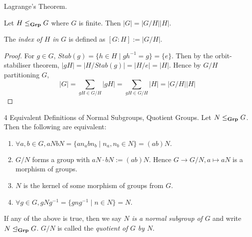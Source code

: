 \documentclass[../book.tex]{subfiles}
\begin{document}
\begin{cor} Lagrange's Theorem. 

    Let $H \leq_{\mathbf{Grp}} G$ where $G$ is finite. 
    Then $|G| = |G / H||H|.$
    
    The \emph{index of $H$ in $G$} is defined as $[G : H] := |G / H|$. 
\end{cor}
\begin{proof}
    For $g \in G$, $Stab(g) = \{h \in H \mid gh^{-1} = g\} = \{e\}$.
    Then by the orbit-stabiliser theorem, $|gH| = |H/Stab(g)| = |H/{e}| = |H|$.
    Hence by $G / H$ partitioning $G$, 
    \[
        |G| = \sum_{gH \in G/H} |gH| = \sum_{gH \in G/H} |H| = |G/H| |H|
    \]
\end{proof}
\begin{dfn} 4 Equivalent Definitions of Normal Subgroups, 
Quotient Groups. 
    Let $N \leq_{\mathbf{Grp}} G$. 
    Then the following are equivalent: 
    \begin{enumerate}
        \item $\forall a, b \in G, aNbN = 
        \{an_abn_b \mid n_a, n_b \in N\} = (ab)N.$
        \item $G / N$ forms a group with $aN \cdot bN := (ab)N$.
            Hence $G \to G/N, a \mapsto aN$ is a morphism of groups.
        \item $N$ is the kernel of some morphism of groups from $G$. 
        \item $\forall g \in G, gNg^{-1} = \{gng^{-1} \mid n \in N\} = N$. 
    \end{enumerate}
    If any of the above is true, 
    then we say \emph{$N$ is a normal subgroup of $G$}
    and write $N \trianglelefteq_{\mathbf{Grp}} G$. 
    $G/N$ is called the \emph{quotient of $G$ by $N$}. 
\end{dfn}
\end{document}

